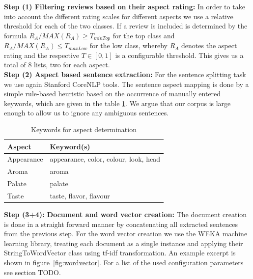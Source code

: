 \documentclass[11pt,titlepage,oneside,openany]{book}
\begin{document}
\textbf{Step (1) Filtering reviews based on their aspect rating:} In order to take into account the different rating scales for different aspects we use a relative threshold for each of the two classes. If a review is included is determined by the formula $R_A/MAX(R_A) \ge T_{minTop}$ for the top class and $R_A/MAX(R_A) \le T_{maxLow}$ for the low class, whereby $R_A$ denotes the aspect rating and the respective $T \in [0,1]$ is a configurable threshold. This gives us a total of 8 lists, two for each aspect.\\

\textbf{Step (2) Aspect based sentence extraction:} For the sentence splitting task we use again Stanford CoreNLP tools. The sentence aspect mapping is done by a simple rule-based heuristic based on the occurrence of manually entered keywords, which are given in the table \ref{tab:keywords}. We argue that our corpus is large enough to allow us to ignore any ambiguous sentences.

\begin{table}[h]
\label{tab:keywords}
\begin{center}
\begin{tabular}{|l|l|}

\hline
\textbf{Aspect} & \textbf{Keyword(s)}                   \\ \hline
Appearance      & appearance, color, colour, look, head \\ \hline
Aroma           & aroma                                 \\ \hline
Palate          & palate                                \\ \hline
Taste           & taste, flavor, flavour                \\ \hline

\end{tabular}
\caption{Keywords for aspect determination}
\end{center}
\end{table}

\textbf{Step (3+4): Document and word vector creation:} The document creation is done in a straight forward manner by concatenating all extracted sentences from the previous step. For the word vector creation we use the WEKA machine learning library, treating each document as a single instance and applying their StringToWordVector class using tf-idf transformation. An example excerpt is shown in figure~\ref{fig:wordvector}. For a list of the used configuration parameters see section TODO.
\end{document}
